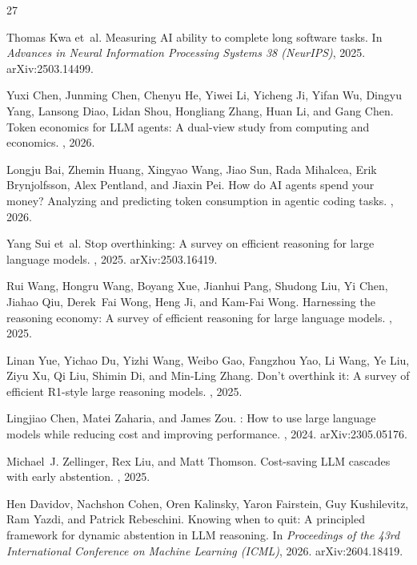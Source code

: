 \documentclass{article}
\begin{document}
\begin{thebibliography}{27}

Thomas Kwa et~al.
\newblock Measuring {AI} ability to complete long software tasks.
\newblock In {\em Advances in Neural Information Processing Systems 38 (NeurIPS)},
  2025. arXiv:2503.14499.

Yuxi Chen, Junming Chen, Chenyu He, Yiwei Li, Yicheng Ji, Yifan Wu, Dingyu Yang,
  Lansong Diao, Lidan Shou, Hongliang Zhang, Huan Li, and Gang Chen.
\newblock Token economics for {LLM} agents: A dual-view study from computing and
  economics.
, 2026.

Longju Bai, Zhemin Huang, Xingyao Wang, Jiao Sun, Rada Mihalcea, Erik Brynjolfsson,
  Alex Pentland, and Jiaxin Pei.
\newblock How do {AI} agents spend your money? {A}nalyzing and predicting token
  consumption in agentic coding tasks.
, 2026.

Yang Sui et~al.
\newblock Stop overthinking: A survey on efficient reasoning for large language
  models.
, 2025. arXiv:2503.16419.

Rui Wang, Hongru Wang, Boyang Xue, Jianhui Pang, Shudong Liu, Yi Chen, Jiahao Qiu,
  Derek~Fai Wong, Heng Ji, and Kam-Fai Wong.
\newblock Harnessing the reasoning economy: A survey of efficient reasoning for large
  language models.
, 2025.

Linan Yue, Yichao Du, Yizhi Wang, Weibo Gao, Fangzhou Yao, Li Wang, Ye Liu, Ziyu Xu,
  Qi Liu, Shimin Di, and Min-Ling Zhang.
\newblock Don't overthink it: A survey of efficient {R1}-style large reasoning models.
, 2025.

Lingjiao Chen, Matei Zaharia, and James Zou.
: How to use large language models while reducing cost and
  improving performance.
, 2024. arXiv:2305.05176.

Michael~J. Zellinger, Rex Liu, and Matt Thomson.
\newblock Cost-saving {LLM} cascades with early abstention.
, 2025.

Hen Davidov, Nachshon Cohen, Oren Kalinsky, Yaron Fairstein, Guy Kushilevitz, Ram
  Yazdi, and Patrick Rebeschini.
\newblock Knowing when to quit: A principled framework for dynamic abstention in {LLM}
  reasoning.
\newblock In {\em Proceedings of the 43rd International Conference on Machine Learning
  (ICML)}, 2026. arXiv:2604.18419.


\end{thebibliography}
\end{document}
